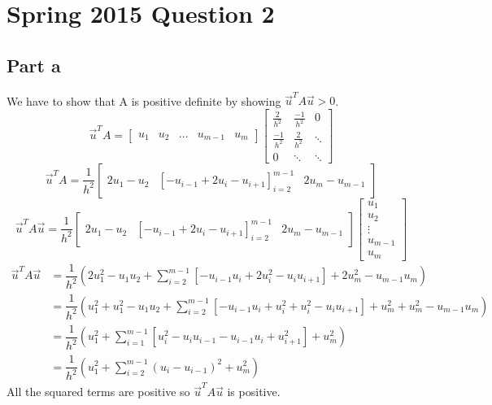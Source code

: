 \documentclass[12pt]{article}
\begin{document}
\section*{Spring 2015 Question 2}

\subsection*{Part a} 
We have to show that A is positive definite by showing $\vec{u}^TA\vec{u} > 0$.
\begin{equation}
\vec{u}^TA = 
\begin{bmatrix}
u_1 & u_2 & \dots & u_{m-1} & u_m
\end{bmatrix}
\begin{bmatrix}
\frac{2}{h^2} & \frac{-1}{h^2} & 0 \\
\frac{-1}{h^2} & \frac{2}{h^2} & \ddots \\
0 & \ddots & \ddots 
\end{bmatrix}
\end{equation}
\begin{equation}
\vec{u}^TA = 
\dfrac{1}{h^2} 
\begin{bmatrix}
2u_1-u_2 & \left[-u_{i-1} + 2u_i - u_{i+1}\right]_{i=2}^{m-1} & 2u_m-u_{m-1}
\end{bmatrix}
\end{equation}
\begin{equation}
\vec{u}^TA\vec{u} = 
\dfrac{1}{h^2} 
\begin{bmatrix}
2u_1-u_2 & \left[-u_{i-1} + 2u_i - u_{i+1}\right]_{i=2}^{m-1} & 2u_m-u_{m-1}
\end{bmatrix}
\begin{bmatrix}
u_1 \\ u_2 \\ \vdots \\ u_{m-1} \\ u_m
\end{bmatrix}
\end{equation}
\begin{equation}
\begin{split}
\vec{u}^TA\vec{u} &= 
\dfrac{1}{h^2} 
\left( 2u_1^2-u_1u_2 + \sum_{i=2}^{m-1} \left[-u_{i-1}u_i + 2u_i^2 - u_iu_{i+1}\right] + 2u_m^2-u_{m-1}u_m \right) \\
&= 
\dfrac{1}{h^2} 
\left( u_1^2 + u_1^2 - u_1u_2 + \sum_{i=2}^{m-1} \left[-u_{i-1}u_i + u_i^2 + u_i^2 - u_iu_{i+1}\right] + u_m^2 + u_m^2 -u_{m-1}u_m \right) \\
&= 
\dfrac{1}{h^2} 
\left( u_1^2 + \sum_{i=1}^{m-1} \left[ u_i^2 - u_iu_{i-1} - u_{i-1}u_i + u_{i+1}^2 \right] + u_m^2 \right) \\
&= 
\dfrac{1}{h^2} 
\left( u_1^2 + \sum_{i=2}^{m-1} \left( u_i - u_{i-1} \right)^2 + u_m^2 \right)
\end{split}
\end{equation}
All the squared terms are positive so $\vec{u}^TA\vec{u}$ is positive.
\end{document}
